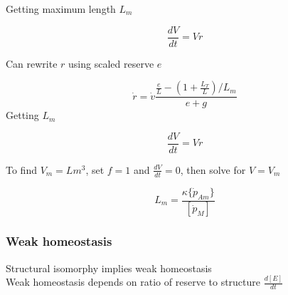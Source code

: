 \documentclass[10,portrait]{article}
\begin{document}
Getting maximum length \(L_{m}\)

\[
\frac
{dV}
{dt}
= V\dot{r}  
\]

Can rewrite \(r\) using scaled reserve \(e\)

\[
\dot{r} = 
\dot{v}
\frac
{\frac
{e}
{L} - 
(1 + \frac
{L_{T}} 
{L}
) /
{L_{m}}}
{e + g}
\] Getting \(L_{m}\)

\[
\frac
{dV}
{dt} = 
V\dot{r}
\]

To find \(V_{m} = Lm^{3}\), set \(f = 1\) and \(\frac{dV}{dt} = 0\),
then solve for \(V = V_{m}\)

\[
L_{m}
=
\frac
{\kappa\{\dot{p}_{Am}\}}
{[\dot{p}_{M}]}
\]

\subsubsection{Weak homeostasis}\label{weak-homeostasis}

Structural isomorphy implies weak homeostasis\\
Weak homeostasis depends on ratio of reserve to structure
\(\frac{d[E]}{dt}\)

\printbibliography
\end{document}
